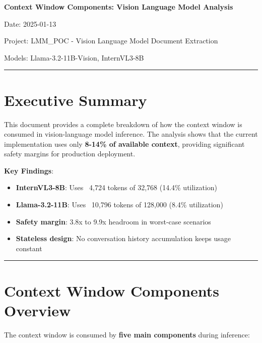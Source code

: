 \documentclass[11pt,a4paper]{article}
\begin{document}
\begin{center}
{\LARGE\bfseries Context Window Components: Vision Language Model Analysis}

\vspace{0.5cm}

{\large Date: 2025-01-13}

{\large Project: LMM\_POC - Vision Language Model Document Extraction}

{\large Models: Llama-3.2-11B-Vision, InternVL3-8B}
\end{center}

\vspace{0.5cm}
\hrule
\vspace{0.5cm}

\section*{Executive Summary}

This document provides a complete breakdown of how the context window is consumed in vision-language model inference. The analysis shows that the current implementation uses only \textbf{8-14\% of available context}, providing significant safety margins for production deployment.

\textbf{Key Findings}:
\begin{itemize}[leftmargin=*]
    \item \textbf{InternVL3-8B}: Uses ~4,724 tokens of 32,768 (14.4\% utilization)
    \item \textbf{Llama-3.2-11B}: Uses ~10,796 tokens of 128,000 (8.4\% utilization)
    \item \textbf{Safety margin}: 3.8x to 9.9x headroom in worst-case scenarios
    \item \textbf{Stateless design}: No conversation history accumulation keeps usage constant
\end{itemize}

\vspace{0.3cm}
\hrule
\vspace{0.5cm}

\tableofcontents

\newpage

\section{Context Window Components Overview}

The context window is consumed by \textbf{five main components} during inference:
\end{document}
